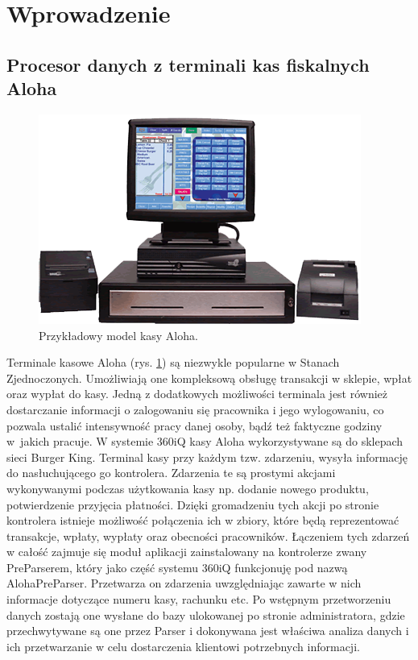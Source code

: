 \documentclass[a4paper]{book}
\begin{document}
\section{Wprowadzenie}
\subsection{Procesor danych z terminali kas fiskalnych Aloha}
\begin{figure}[t]
	\centering
	\includegraphics{./img/aloha_pos.png}
	\caption{Przykładowy model kasy Aloha.}
	\label{fig:aloha_pos}
\end{figure}
Terminale kasowe Aloha (rys. \ref{fig:aloha_pos}) są niezwykle popularne w Stanach Zjednoczonych. Umożliwiają one kompleksową obsługę transakcji w sklepie, wpłat oraz wypłat do kasy. Jedną z dodatkowych możliwości terminala jest również dostarczanie informacji o zalogowaniu się pracownika i jego wylogowaniu, co pozwala ustalić intensywność pracy danej osoby, bądź też faktyczne godziny w~jakich pracuje. W systemie 360iQ kasy Aloha wykorzystywane są do sklepach sieci Burger King. Terminal kasy przy każdym tzw. zdarzeniu, wysyła informację do nasłuchującego go kontrolera. Zdarzenia te są prostymi akcjami wykonywanymi podczas użytkowania kasy np. dodanie nowego produktu, potwierdzenie przyjęcia płatności. Dzięki gromadzeniu tych akcji po stronie kontrolera istnieje możliwość połączenia ich w zbiory, które będą reprezentować transakcje, wpłaty, wypłaty oraz obecności pracowników. Łączeniem tych zdarzeń w całość zajmuje się moduł aplikacji zainstalowany na kontrolerze zwany PreParserem, który jako część systemu 360iQ funkcjonuję pod nazwą AlohaPreParser. Przetwarza on zdarzenia uwzględniając zawarte w nich informacje dotyczące numeru kasy, rachunku etc.
Po wstępnym przetworzeniu danych zostają one wysłane do bazy ulokowanej po stronie administratora, gdzie przechwytywane są one przez Parser i dokonywana jest właściwa analiza danych i ich przetwarzanie w celu dostarczenia klientowi potrzebnych informacji. 
\newpage
\end{document}
